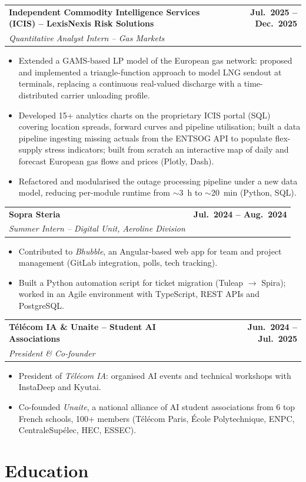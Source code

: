 \documentclass[a4paper,10pt]{article}
\makeatletter
\newcommand{\cventry}[4]{%
  \noindent
  \begin{tabularx}{\textwidth}{@{}X@{\hspace{6pt}}r@{}}
    \textbf{#1} & \textbf{#3}\\
    \textit{#2} & \\
  \end{tabularx}
  \par\vspace{-1pt}
  #4
  \vspace{5pt}
}
\makeatother
\begin{document}
\cventry{Independent Commodity Intelligence Services (ICIS) -- LexisNexis Risk Solutions}%
  {Quantitative Analyst Intern -- Gas Markets}{Jul.~2025 -- Dec.~2025}{%
  \begin{itemize}
    \item Extended a GAMS-based LP model of the European gas network: proposed and implemented a triangle-function approach to model LNG sendout at terminals, replacing a continuous real-valued discharge with a time-distributed carrier unloading profile.
    \item Developed 15+ analytics charts on the proprietary ICIS portal (SQL) covering location spreads, forward curves and pipeline utilisation; built a data pipeline ingesting missing actuals from the ENTSOG API to populate flex-supply stress indicators; built from scratch an interactive map of daily and forecast European gas flows and prices (Plotly, Dash).
    \item Refactored and modularised the outage processing pipeline under a new data model, reducing per-module runtime from $\sim$3~h to $\sim$20~min (Python, SQL).
  \end{itemize}
}

\cventry{Sopra Steria}%
  {Summer Intern -- Digital Unit, Aeroline Division}{Jul.~2024 -- Aug.~2024}{%
  \begin{itemize}
    \item Contributed to \textit{Bhubble}, an Angular-based web app for team and project management (GitLab integration, polls, tech tracking).
    \item Built a Python automation script for ticket migration (Tuleap $\to$ Spira); worked in an Agile environment with TypeScript, REST APIs and PostgreSQL.
  \end{itemize}
}

\cventry{T\'el\'ecom IA \& Unaite -- Student AI Associations}%
  {President \& Co-founder}{Jun.~2024 -- Jul.~2025}{%
  \begin{itemize}
    \item President of \textit{T\'el\'ecom IA}: organised AI events and technical workshops with InstaDeep and Kyutai.
    \item Co-founded \textit{Unaite}, a national alliance of AI student associations from 6 top French schools, 100+ members (T\'el\'ecom Paris, \'Ecole Polytechnique, ENPC, CentraleSup\'elec, HEC, ESSEC).
  \end{itemize}
}

\section{Education}
\end{document}
